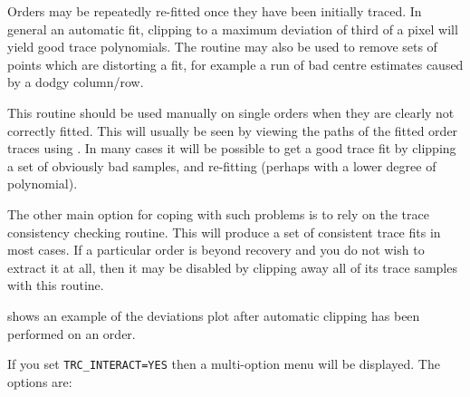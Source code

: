 Orders may be repeatedly re-fitted once they have been initially traced.
In general an automatic fit, clipping to a maximum deviation of third of
a pixel will yield good trace polynomials. The routine may also be used
to remove sets of points which are distorting a fit, for example a run
of bad centre estimates caused by a dodgy column/row.

This routine should be used manually on single orders when they are
clearly not correctly fitted. This will usually be seen by viewing the
paths of the fitted order traces using
\@. In many cases
it will be possible to get a good trace fit by clipping a set of obviously
bad samples, and re-fitting (perhaps with a lower degree of polynomial).

The other main option for coping with such problems is to rely on the trace
consistency checking routine.  This will produce a set of consistent
trace fits in most cases.
If a particular order is beyond recovery and you do not wish to extract it
at all, then it may be disabled by clipping away all of its trace samples
with this routine.

shows an example of the deviations plot after
automatic clipping has been performed on an order.

If you set {\tt TRC\_INTERACT=YES} then a multi-option menu will be displayed.
The options are:

